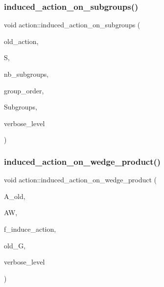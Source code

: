 \mbox{\label{classaction_ad0de7ea45a2a73c1b8e0f52ee3ce4610}} 
\subsubsection{\texorpdfstring{induced\+\_\+action\+\_\+on\+\_\+subgroups()}{induced\_action\_on\_subgroups()}}
{\footnotesize\ttfamily void action\+::induced\+\_\+action\+\_\+on\+\_\+subgroups (\begin{DoxyParamCaption}\item[{\mbox{\hyperlink{classaction}{action}} $\ast$}]{old\+\_\+action,  }\item[{\mbox{\hyperlink{classsims}{sims}} $\ast$}]{S,  }\item[{\mbox{\hyperlink{galois_8h_a09fddde158a3a20bd2dcadb609de11dc}{I\+NT}}}]{nb\+\_\+subgroups,  }\item[{\mbox{\hyperlink{galois_8h_a09fddde158a3a20bd2dcadb609de11dc}{I\+NT}}}]{group\+\_\+order,  }\item[{\mbox{\hyperlink{classsubgroup}{subgroup}} $\ast$$\ast$}]{Subgroups,  }\item[{\mbox{\hyperlink{galois_8h_a09fddde158a3a20bd2dcadb609de11dc}{I\+NT}}}]{verbose\+\_\+level }\end{DoxyParamCaption})}

\mbox{\label{classaction_af13a5da25b8e8597ab695edff222fb6a}} 
\subsubsection{\texorpdfstring{induced\+\_\+action\+\_\+on\+\_\+wedge\+\_\+product()}{induced\_action\_on\_wedge\_product()}}
{\footnotesize\ttfamily void action\+::induced\+\_\+action\+\_\+on\+\_\+wedge\+\_\+product (\begin{DoxyParamCaption}\item[{\mbox{\hyperlink{classaction}{action}} $\ast$}]{A\+\_\+old,  }\item[{\mbox{\hyperlink{classaction__on__wedge__product}{action\+\_\+on\+\_\+wedge\+\_\+product}} $\ast$}]{AW,  }\item[{\mbox{\hyperlink{galois_8h_a09fddde158a3a20bd2dcadb609de11dc}{I\+NT}}}]{f\+\_\+induce\+\_\+action,  }\item[{\mbox{\hyperlink{classsims}{sims}} $\ast$}]{old\+\_\+G,  }\item[{\mbox{\hyperlink{galois_8h_a09fddde158a3a20bd2dcadb609de11dc}{I\+NT}}}]{verbose\+\_\+level }\end{DoxyParamCaption})}

